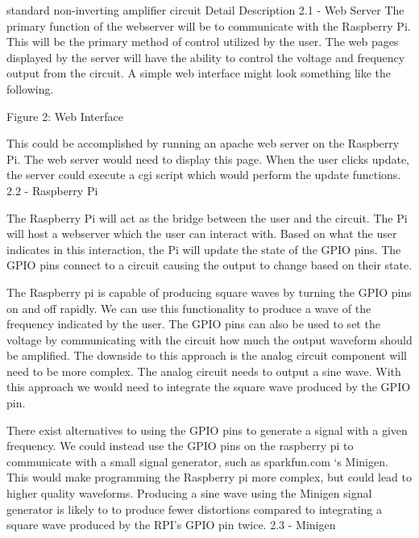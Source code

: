\documentclass{article}	%
\begin{document}
\begin{multicols}{2}
standard non-inverting amplifier circuit 
Detail Description
2.1 - Web Server
The primary function of the webserver will be to communicate with the Raspberry Pi. This will be the primary method of control utilized by the user. The web pages displayed by the server will have the ability to control the voltage and frequency output from the circuit. A simple web interface might look something like the following.

Figure 2: Web Interface

This could be accomplished by running an apache web server on the Raspberry Pi. The web server would need to display this page. When the user clicks update, the server could execute a cgi script which would perform the update functions.
2.2 - Raspberry Pi

The Raspberry Pi will act as the bridge between the user and the circuit. The Pi will host a webserver which the user can interact with. Based on what the user indicates in this interaction, the Pi will update the state of the GPIO pins. The GPIO pins connect to a circuit causing the output to change based on their state. 

The Raspberry pi is capable of producing square waves by turning the GPIO pins on and off rapidly. We can use this functionality to produce a wave of the frequency indicated by the user. The GPIO pins can also be used to set the voltage by communicating with the circuit how much the output waveform should be amplified. The downside to this approach is the analog circuit component will need to be more complex. The analog circuit needs to output a sine wave. With this approach we would need to integrate the square wave produced by the GPIO pin.

There exist alternatives to using the GPIO pins to generate a signal with a given frequency. We could instead use the GPIO pins on the raspberry pi to communicate with a small signal generator, such as sparkfun.com ‘s Minigen. This would make programming the Raspberry pi more complex, but could lead to higher quality waveforms. Producing a sine wave using the Minigen signal generator is likely to to produce fewer distortions compared to integrating a square wave produced by the RPI’s GPIO pin twice. 
2.3 - Minigen


\end{multicols}
\end{document}

